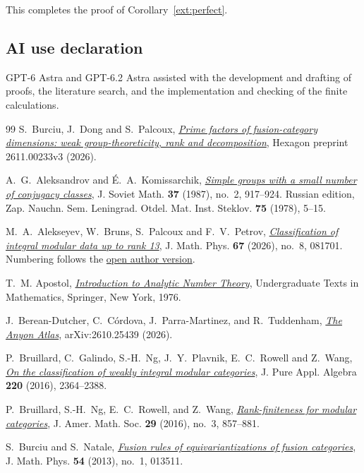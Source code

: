 \documentclass[11pt]{amsart}
\numberwithin{equation}{section}
\theoremstyle{definition}
\theoremstyle{plain}
\begin{document}
This completes the proof of Corollary~\ref{ext:perfect}.

\subsection*{AI use declaration}
GPT-6 Astra and GPT-6.2 Astra assisted with the development and drafting of proofs,
the literature search, and the implementation and checking of the
finite calculations.

\begin{thebibliography}{99}
S.~Burciu, J.~Dong and S.~Palcoux,
\href{https://hexagonmath.org/2611.00233v3}{\emph{Prime factors of fusion-category dimensions: weak group-theoreticity, rank and decomposition}},
Hexagon preprint 2611.00233v3 (2026).

A.~G.~Aleksandrov and \'E.~A.~Komissarchik,
\href{https://doi.org/10.1007/BF01089081}{\emph{Simple groups with a small number of conjugacy classes}},
J. Soviet Math. \textbf{37} (1987), no.~2, 917--924.
Russian edition, Zap. Nauchn. Sem. Leningrad. Otdel. Mat. Inst. Steklov.
\textbf{75} (1978), 5--15.

M.~A.~Alekseyev, W.~Bruns, S.~Palcoux and F.~V.~Petrov,
\href{https://doi.org/10.1063/5.0334158}{\emph{Classification of integral
modular data up to rank 13}}, J. Math. Phys. \textbf{67} (2026), no.~8, 081701. Numbering follows the \href{https://arxiv.org/abs/2302.01613v10}{open author version}.

T.~M. Apostol,
\href{https://doi.org/10.1007/978-1-4757-5579-4}{\emph{Introduction to Analytic Number Theory}},
Undergraduate Texts in Mathematics, Springer, New York, 1976.

J.~Berean-Dutcher, C.~C\'ordova, J.~Parra-Martinez, and R.~Tuddenham,
\href{https://arxiv.org/abs/2610.25439}{\emph{The Anyon Atlas}},
arXiv:2610.25439 (2026).

P.~Bruillard, C.~Galindo, S.-H.~Ng, J.~Y.~Plavnik, E.~C.~Rowell and
Z.~Wang, \href{https://doi.org/10.1016/j.jpaa.2015.11.010}{\emph{On the classification of weakly integral modular
categories}}, J. Pure Appl. Algebra \textbf{220} (2016), 2364--2388.

P.~Bruillard, S.-H.~Ng, E.~C.~Rowell, and Z.~Wang,
\href{https://doi.org/10.1090/jams/842}{\emph{Rank-finiteness for modular categories}},
J. Amer. Math. Soc. \textbf{29} (2016), no.~3, 857--881.

S.~Burciu and S.~Natale,
\href{https://doi.org/10.1063/1.4774293}{\emph{Fusion rules of equivariantizations of fusion categories}},
J. Math. Phys. \textbf{54} (2013), no.~1, 013511.


\end{thebibliography}
\end{document}
